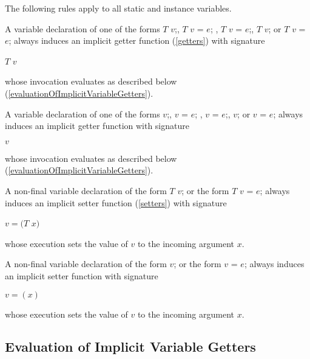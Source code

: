 \documentclass{article}
\newcommand{\code}[1]{{\sf #1}}
\begin{document}
\LMHash{}
The following rules apply to all static and instance variables.

\LMHash{}
A  variable declaration  of one of the forms \code{$T$ $v$;},  \code{$T$ $v$ = $e$;} ,  \code{\CONST{} $T$ $v$ = $e$;}, \code{\FINAL{} $T$ $v$;}  or \code{\FINAL{} $T$ $v$ = $e$;} always induces an implicit  getter function (\ref{getters}) with signature

$T$ \GET{} $v$

whose invocation evaluates as described below (\ref{evaluationOfImplicitVariableGetters}).


\LMHash{}
A  variable declaration  of one of the forms \code{\VAR{} $v$;},  \code{\VAR{} $v$ = $e$;} ,  \code{\CONST{} $v$ = $e$;}, \code{\FINAL{} $v$;} or \code{\FINAL{}  $v$ = $e$;}  always induces an implicit  getter function with signature

 \GET{} $v$

whose  invocation evaluates as described below (\ref{evaluationOfImplicitVariableGetters}).

\LMHash{}
A non-final  variable declaration  of the form \code{{} $T$ $v$;} or the form  \code{$T$ $v$ = $e$;}   always induces an implicit  setter function (\ref{setters}) with signature

 \VOID{} \SET{} $v=(T$ $x)$

whose execution sets the value of $v$ to the incoming argument $x$.

\LMHash{}
A  non-final variable declaration  of the form \code{\VAR{} $v$;} or the form  \code{\VAR{} $v$ = $e$;}   always induces an implicit  setter function with signature

\SET{} $v=(x)$

whose execution sets the value of $v$ to the incoming argument $x$.


\subsection{Evaluation of Implicit  Variable Getters}
\end{document}
